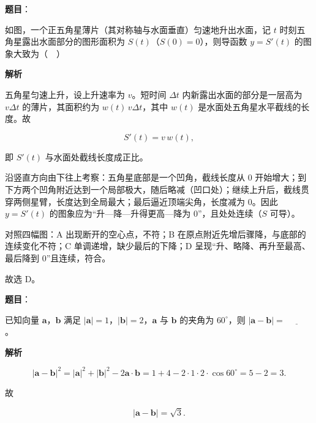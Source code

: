 \begin{answer}

\textbf{题目}：

如图，一个正五角星薄片（其对称轴与水面垂直）匀速地升出水面，记 $t$ 时刻五角星露出水面部分的图形面积为 $S(t)$（$S(0)=0$），则导函数 $y=S'(t)$ 的图象大致为（　）
\nopagebreak[4]
\begin{center}\end{center}
\nopagebreak[4]
\textbf{解析}

五角星匀速上升，设上升速率为 $v$。短时间 $\Delta t$ 内新露出水面的部分是一层高为 $v\Delta t$ 的薄片，其面积约为 $w(t)\,v\Delta t$，其中 $w(t)$ 是水面处五角星水平截线的长度。故

\nopagebreak[4]
\[S'(t)=v\,w(t),\]

即 $S'(t)$ 与水面处截线长度成正比。

沿竖直方向由下往上考察：五角星底部是一个凹角，截线长度从 $0$ 开始增大；到下方两个凹角附近达到一个局部极大，随后略减（凹口处）；继续上升后，截线贯穿两侧星臂，长度达到全局最大；最后逼近顶端尖角，长度减为 $0$。因此 $y=S'(t)$ 的图象应为“升—降—升得更高—降为 $0$”，且处处连续（$S$ 可导）。

对照四幅图：A 出现断开的空心点，不符；B 在原点附近先增后骤降，与底部的连续变化不符；C 单调递增，缺少最后的下降；D 呈现“升、略降、再升至最高、最后降到 $0$”且连续，符合。

故选 D。


\end{answer}
\begin{answer}

\textbf{题目}：

已知向量 $\boldsymbol a$，$\boldsymbol b$ 满足 $|\boldsymbol a|=1$，$|\boldsymbol b|=2$，$\boldsymbol a$ 与 $\boldsymbol b$ 的夹角为 $60^\circ$，则 $|\boldsymbol a-\boldsymbol b|=$ $\underline{\qquad}$。

\textbf{解析}

\nopagebreak[4]
\[|\boldsymbol a-\boldsymbol b|^2=|\boldsymbol a|^2+|\boldsymbol b|^2-2\boldsymbol a\cdot\boldsymbol b
=1+4-2\cdot1\cdot2\cdot\cos60^\circ
=5-2=3.\]

故

\nopagebreak[4]
\[|\boldsymbol a-\boldsymbol b|=\sqrt3.\]


\end{answer}
